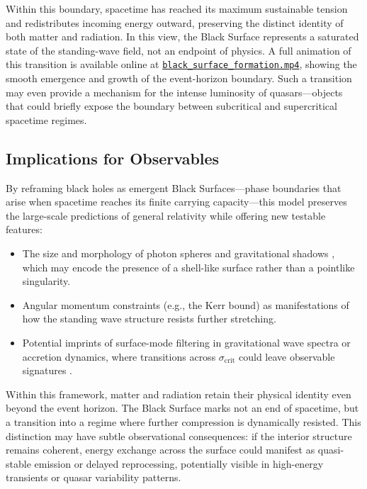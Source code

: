 \documentclass[12pt]{article}
\begin{document}
Within this boundary, spacetime has reached its maximum sustainable tension and redistributes incoming energy outward, preserving the distinct identity of both matter and radiation. In this view, the Black Surface represents a saturated state of the standing-wave field, not an endpoint of physics. A full animation of this transition is available online at \href{https://github.com/wbrassem/standing-wave-spacetime/raw/main/build/black_surface_formation.mp4}{\texttt{black\_surface\_formation.mp4}}, showing the smooth emergence and growth of the event-horizon boundary. Such a transition may even provide a mechanism for the intense luminosity of quasars---objects that could briefly expose the boundary between subcritical and supercritical spacetime regimes.

\subsection{Implications for Observables}

By reframing black holes as emergent Black Surfaces—phase boundaries that arise when spacetime reaches its finite carrying capacity—this model preserves the large-scale predictions of general relativity while offering new testable features:
\begin{itemize}
    \item The size and morphology of photon spheres and gravitational shadows \cite{eventhorizon2019}, which may encode the presence of a shell-like surface rather than a pointlike singularity.
    \item Angular momentum constraints (e.g., the Kerr bound) as manifestations of how the standing wave structure resists further stretching.
    \item Potential imprints of surface-mode filtering in gravitational wave spectra or accretion dynamics, where transitions across $\sigma_{\text{crit}}$ could leave observable signatures \cite{abbott2016, cardoso2016}.
\end{itemize}

Within this framework, matter and radiation retain their physical identity even beyond the event horizon. The Black Surface marks not an end of spacetime, but a transition into a regime where further compression is dynamically resisted. This distinction may have subtle observational consequences: if the interior structure remains coherent, energy exchange across the surface could manifest as quasi-stable emission or delayed reprocessing, potentially visible in high-energy transients or quasar variability patterns.
\end{document}
